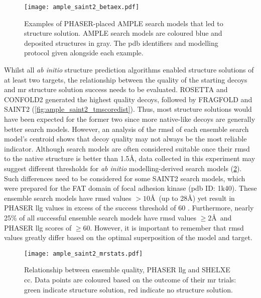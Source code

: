 \begin{figure}[H]
    \centering
    \texttt{[image: ample\_saint2\_betaex.pdf]}
    \caption[Examples of PHASER-placed AMPLE search models.]{Examples of PHASER-placed AMPLE search models that led to structure solution. AMPLE search models are coloured blue and deposited structures in gray. The \gls{pdb} identifiers and modelling protocol given alongside each example.}
    \label{fig:ample_saint2_betaex}
\end{figure}

Whilst all \textit{ab initio} structure prediction algorithms enabled structure solutions of at least two targets, the relationship between the quality of the starting decoys and \gls{mr} structure solution success needs to be evaluated. ROSETTA and CONFOLD2 generated the highest quality decoys, followed by FRAGFOLD and SAINT2 (\cref{fig:ample_saint2_tmscoredist}). Thus, most structure solutions would have been expected for the former two since more native-like decoys are generally better search models. However, an analysis of the \gls{rmsd} of each ensemble search model's centroid shows that decoy quality may not always be the most reliable indicator. Although search models are often considered suitable once their \gls{rmsd} to the native structure is better than 1.5\AA \cite{Scapin2013-yp}, data collected in this experiment may suggest different thresholds for \textit{ab initio} modelling-derived search models (\cref{fig:ample_saint2_mrstats}). Such differences need to be considered for some SAINT2 search models, which were prepared for the FAT domain of focal adhesion kinase (\gls{pdb} ID: 1k40). These ensemble search models have \gls{rmsd} values $>10$\AA\ (up to 28\AA) yet result in PHASER \gls{llg} values in excess of the success threshold of 60 \cite{Oeffner2018-ur}. Furthermore, nearly 25\% of all successful ensemble search models have \gls{rmsd} values $\geq2$\AA\ and PHASER \gls{llg} scores of $\geq$60. However, it is important to remember that \gls{rmsd} values greatly differ based on the optimal superposition of the model and target.

\begin{figure}[H]
    \centering
    \texttt{[image: ample\_saint2\_mrstats.pdf]}
    \caption[Relationship between ensemble quality, PHASER LLG and SHELXE CC]{Relationship between ensemble quality, PHASER \gls{llg} and SHELXE \gls{cc}. Data points are coloured based on the outcome of their \gls{mr} trials: green indicate structure solution, red indicate no structure solution.}
    \label{fig:ample_saint2_mrstats}
\end{figure}

